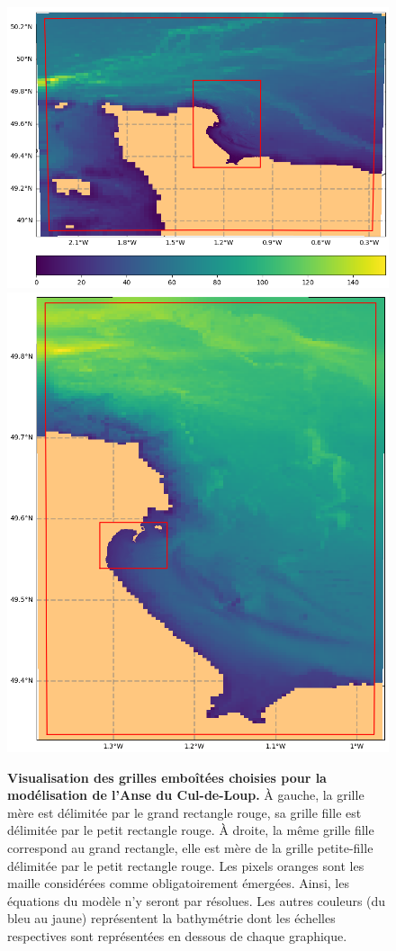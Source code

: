 \documentclass[10pt,a4paper,titlepage]{article}
\begin{document}
\begin{figure}[h!]
\centering
\includegraphics[scale=0.4]{../images/croco_grd.nc.1_V2.png}
\includegraphics[scale=0.27]{../images/croco_grd.nc.2_V2.png}
\caption{
    \textbf{Visualisation des grilles emboîtées choisies pour la modélisation de l'Anse du Cul-de-Loup.}
    À gauche, la grille mère est délimitée par le grand rectangle rouge, sa grille fille est délimitée par le petit rectangle rouge.
    À droite, la même grille fille correspond au grand rectangle, elle est mère de la grille petite-fille délimitée par le petit rectangle rouge.
    Les pixels oranges sont les maille considérées comme obligatoirement émergées. Ainsi, les équations du modèle n'y seront par résolues.
    Les autres couleurs (du bleu au jaune) représentent la bathymétrie dont les échelles respectives sont représentées en dessous de chaque graphique.
}
\label{fig:imbrication}
\end{figure}
\end{document}
